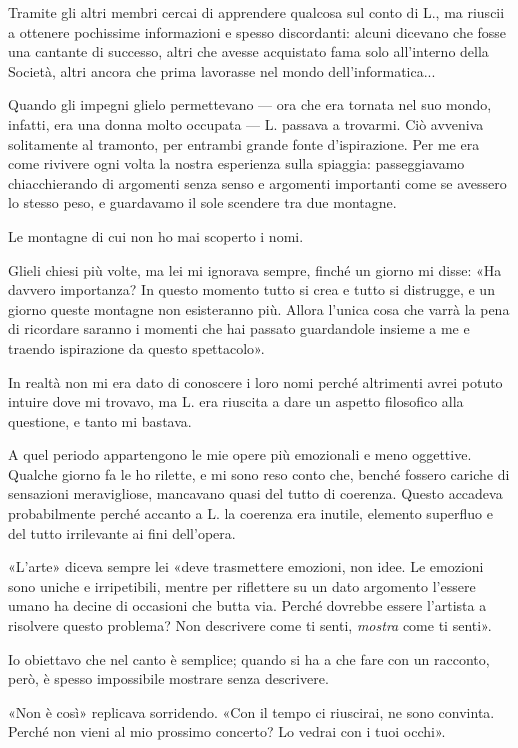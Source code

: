 \documentclass[a4paper,12pt]{book}
\begin{document}
Tramite gli altri membri cercai di apprendere qualcosa sul conto di L., ma
riuscii a ottenere pochissime informazioni e spesso discordanti: alcuni dicevano
che fosse una cantante di successo, altri che avesse acquistato fama solo
all'interno della Società, altri ancora che prima lavorasse nel mondo
dell'informatica...

Quando gli impegni glielo permettevano --- ora che era tornata nel suo mondo,
infatti, era una donna molto occupata --- L. passava a trovarmi. Ciò avveniva
solitamente al tramonto, per entrambi grande fonte d'ispirazione. Per me era
come rivivere ogni volta la nostra esperienza sulla spiaggia: passeggiavamo
chiacchierando di argomenti senza senso e argomenti importanti come se avessero
lo stesso peso, e guardavamo il sole scendere tra due montagne.

Le montagne di cui non ho mai scoperto i nomi.

Glieli chiesi più volte, ma lei mi ignorava sempre, finché un giorno mi disse:
«Ha davvero importanza? In questo momento tutto si crea e tutto si distrugge,
e un giorno queste montagne non esisteranno più. Allora l'unica cosa che varrà
la pena di ricordare saranno i momenti che hai passato guardandole insieme a me
e traendo ispirazione da questo spettacolo».

In realtà non mi era dato di conoscere i loro nomi perché altrimenti avrei
potuto intuire dove mi trovavo, ma L. era riuscita a dare un aspetto filosofico
alla questione, e tanto mi bastava.

A quel periodo appartengono le mie opere più emozionali e meno oggettive.
Qualche giorno fa le ho rilette, e mi sono reso conto che, benché fossero
cariche di sensazioni meravigliose, mancavano quasi del tutto di coerenza.
Questo accadeva probabilmente perché accanto a L. la coerenza era inutile,
elemento superfluo e del tutto irrilevante ai fini dell'opera.

«L'arte» diceva sempre lei «deve trasmettere emozioni, non idee. Le emozioni
sono uniche e irripetibili, mentre per riflettere su un dato argomento l'essere
umano ha decine di occasioni che butta via. Perché dovrebbe essere l'artista a
risolvere questo problema? Non descrivere come ti senti, \emph{mostra} come ti
senti».

Io obiettavo che nel canto è semplice; quando si ha a che fare con un racconto,
però, è spesso impossibile mostrare senza descrivere.

«Non è così» replicava sorridendo. «Con il tempo ci riuscirai, ne sono convinta.
Perché non vieni al mio prossimo concerto? Lo vedrai con i tuoi occhi».
\end{document}
